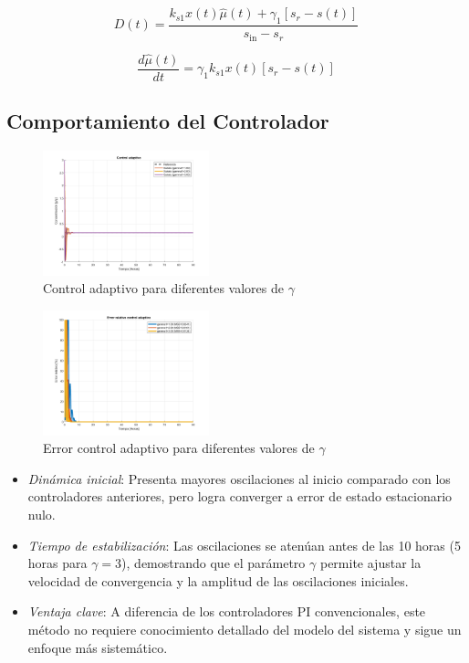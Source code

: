 \documentclass[letterpaper, 10 pt, conference]{ieeeconf}  %
\begin{document}
\begin{equation*}
D(t) = \frac{k_{s1} x(t) \hat{\mu}(t) + \gamma_1 [s_r - s(t)]}{s_{\text{in}} - s_r}
\end{equation*}

\begin{equation*}
\frac{d\hat{\mu}(t)}{dt} = \gamma_1 k_{s1} x(t) [s_r - s(t)]
\end{equation*}

\subsection{Comportamiento del Controlador}

\begin{figure}[H]
  \centering
  \includegraphics[width=0.43\textwidth]{./Images_tp3/ad.png}
  \caption{Control adaptivo para diferentes valores de $\gamma$}
\end{figure}
\begin{figure}[H]
  \centering
  \includegraphics[width=0.43\textwidth]{./Images_tp3/ad_err.png}
  \caption{Error control adaptivo para diferentes valores de $\gamma$}
\end{figure}

\begin{itemize}
    \item \textit{Dinámica inicial}: Presenta mayores oscilaciones al inicio comparado con los controladores anteriores, pero logra converger a error de estado estacionario nulo.
    \item \textit{Tiempo de estabilización}: Las oscilaciones se atenúan antes de las 10 horas (5 horas para \(\gamma = 3\)), demostrando que el parámetro \(\gamma\) permite ajustar la velocidad de convergencia y la amplitud de las oscilaciones iniciales.
    \item \textit{Ventaja clave}: A diferencia de los controladores PI convencionales, este método no requiere conocimiento detallado del modelo del sistema y sigue un enfoque más sistemático.
\end{itemize}
\end{document}
